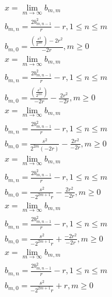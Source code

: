\documentclass[a4paper,12pt]{report}
\begin{document}
\begin{subequations}
\begin{gather}
x = \lim \limits_{m \to \infty} b_{m,m} \\
b_{m,n} = \frac{2b_{m,n-1}^2}{r} - r, 1 \leq n \leq m \\
b_{m,0} = \frac{\left(\frac{s^2}{2^{2m}}\right) - 2r^2}{-2r}, m \geq 0
\end{gather}
\end{subequations}
\begin{subequations}
\begin{gather}
x = \lim \limits_{m \to \infty} b_{m,m} \\
b_{m,n} = \frac{2b_{m,n-1}^2}{r} - r, 1 \leq n \leq m \\
b_{m,0} = \frac{\left(\frac{s^2}{2^{2m}}\right)}{-2r} - \frac{2r^2}{-2r}, m \geq 0
\end{gather}
\end{subequations}
\begin{subequations}
\begin{gather}
x = \lim \limits_{m \to \infty} b_{m,m} \\
b_{m,n} = \frac{2b_{m,n-1}^2}{r} - r, 1 \leq n \leq m \\
b_{m,0} = \frac{s^2}{2^{2m}(-2r)} - \frac{2r^2}{-2r}, m \geq 0
\end{gather}
\end{subequations}
\begin{subequations}
\begin{gather}
x = \lim \limits_{m \to \infty} b_{m,m} \\
b_{m,n} = \frac{2b_{m,n-1}^2}{r} - r, 1 \leq n \leq m \\
b_{m,0} = \frac{s^2}{-2^{2m+1}r} - \frac{2r^2}{-2r}, m \geq 0
\end{gather}
\end{subequations}
\begin{subequations}
\begin{gather}
x = \lim \limits_{m \to \infty} b_{m,m} \\
b_{m,n} = \frac{2b_{m,n-1}^2}{r} - r, 1 \leq n \leq m \\
b_{m,0} = \frac{s^2}{-2^{2m+1}r} + \frac{-2r^2}{-2r}, m \geq 0
\end{gather}
\end{subequations}
\begin{subequations}
\begin{gather}
x = \lim \limits_{m \to \infty} b_{m,m} \\
b_{m,n} = \frac{2b_{m,n-1}^2}{r} - r, 1 \leq n \leq m \\
b_{m,0} = \frac{s^2}{-2^{2m+1}r} + r, m \geq 0
\end{gather}
\end{subequations}
\end{document}
